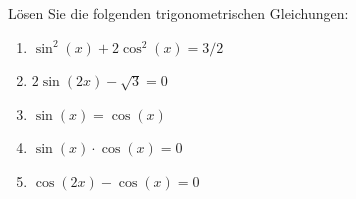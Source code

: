 \begin{ExerciseBlock}
L\"osen Sie die folgenden trigonometrischen Gleichungen:
\begin{enumerate}[label=\alph*)]
\item $\displaystyle \sin^2(x) + 2 \cos^2(x) = 3/2 $
\item $\displaystyle 2 \sin(2x)-\sqrt{3} = 0$
\item $\displaystyle \sin(x) = \cos(x)$
\item $\displaystyle \sin(x) \cdot \cos(x) = 0$
\item $\displaystyle \cos(2 x) - \cos(x) = 0$
\end{enumerate}

\end{ExerciseBlock}

